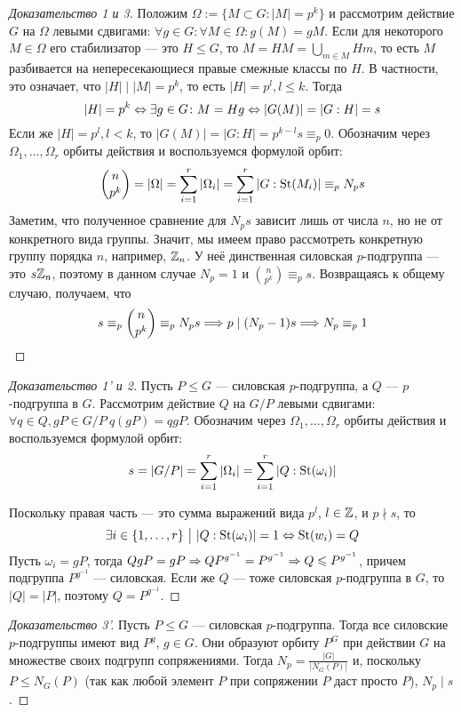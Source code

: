 \begin{proof}[Доказательство 1 и 3]
	Положим $\Omega := \{M  \subset G: |M| = p^k\}$ и рассмотрим действие $G$ на $\Omega$ левыми сдвигами: $\forall g \in G: \forall M \in \Omega: g(M) = gM$. Если для некоторого $M \in \Omega$ его стабилизатор --- это $H \le G$, то $M = HM = \bigcup_{m \in M}Hm$, то есть $M$ разбивается на непересекающиеся правые смежные классы по $H$. В частности, это означает, что $|H| \mid |M| = p^k$, то есть $|H| = p^l, l \le k$. Тогда 
	\[
		|H| = p^k \Leftrightarrow \exists g \in G \colon M = Hg \Leftrightarrow |G(M)| = |G : H| = s
	\]
	Если же $|H| = p^l, l < k$, то $|G(M)| = |G : H| = p^{k-l}s \equiv_p 0$. Обозначим через $\Omega_1, \ldots, \Omega_r$ орбиты действия и воспользуемся формулой орбит:
	\[
		\binom{n}{p^k} = |\Omega| = \sum\limits_{i = 1}^r|\Omega_i| = \sum\limits_{i = 1}^r|G : \operatorname{St}(M_i)| \equiv_p N_ps
	\]
	Заметим, что полученное сравнение для $N_ps$ зависит лишь от числа $n$, но не от конкретного вида группы. Значит, мы имеем право рассмотреть конкретную группу порядка $n$, например, $\mathbb{Z}_n$. У неё динственная силовская $p$-подгруппа --- это $s\mathbb{Z}_n$, поэтому в данном случае $N_p = 1$ и $\binom{n}{p^k} \equiv_p s$. Возвращаясь к общему случаю, получаем, что
	\[
		s \equiv_p \binom{n}{p^k} \equiv_p N_ps \Longrightarrow p \mid (N_p - 1)s \Longrightarrow N_p \equiv_p 1
	\]
\end{proof}

\begin{proof}[Доказательство 1' и 2]
	Пусть $P \le G$ --- силовская $p$-подгруппа, а $Q$ --- $p$-подгруппа в $G$. Рассмотрим действие $Q$ на $G / P$ левыми сдвигами: $\forall q \in Q, gP \in G / P\ q(gP) = qgP$. Обозначим через $\Omega_1, \ldots, \Omega_r$ орбиты действия и воспользуемся формулой орбит:
	\[s = |G / P| = \sum\limits_{i = 1}^r |\Omega_i| = \sum_{i = 1}^r |Q : \operatorname{St}(\omega_i)|\]
	
	Поскольку правая часть --- это сумма выражений вида $p^l$, $l \in \mathbb{Z}$, и $p \nmid s$, то
	\[
		\exists i \in \{1, \ldots, r\} \ \big|\  |Q : \operatorname{St}(\omega_i)| = 1 \Leftrightarrow \operatorname{St}(w_i) = Q
	\]
	Пусть $\omega_i = gP$, тогда $QgP = gP \Rightarrow QP^{g^{-1}} = P^{g^{-1}} \Rightarrow Q \leqslant P^{g^{-1}}$, причем подгруппа $P^{g^{-1}}$ --- силовская. Если же $Q$ --- тоже силовская $p$-подгруппа в $G$, то $|Q| = |P|$, поэтому $Q = P^{g^{-1}}$.
\end{proof}

\begin{proof}[Доказательство 3']
	Пусть $P \le G$ --- силовская $p$-подгруппа. Тогда все силовские $p$-подгруппы имеют вид $P^g$, $g \in G$. Они образуют орбиту $P^G$ при действии $G$ на множестве своих подгрупп сопряжениями. Тогда $N_p = \frac{|G|}{|N_G(P)|}$ и, поскольку $P \le N_G(P)$ (так как любой элемент $P$ при сопряжении $P$ даст просто $P$), $N_p \mid s$.
\end{proof}

